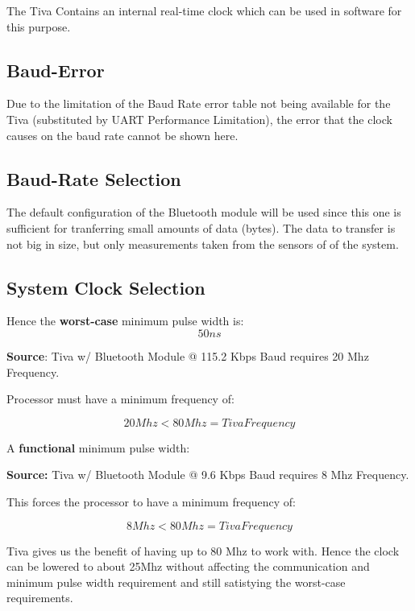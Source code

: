 		The Tiva Contains an internal real-time clock which can be used in software for this purpose.

	\subsection{Baud-Error}
		Due to the limitation of the Baud Rate error table not being available for the Tiva (substituted by UART Performance Limitation), the error that the clock causes on the baud rate cannot be shown here.

	\subsection{Baud-Rate Selection}
		The default configuration of the Bluetooth module will be used since this one is sufficient for tranferring small amounts of data (bytes). The data to transfer is not big in size, but only measurements taken from the sensors of of the system.

	\subsection{System Clock Selection}
		Hence the \textbf{worst-case} minimum pulse width is: 
					$$ 50ns $$

		\noindent \textbf{Source}: Tiva w/ Bluetooth Module @ 115.2 Kbps Baud
		requires 20 Mhz Frequency.

		\noindent Processor must have a minimum frequency of:
			
			$$ 20 Mhz < 80Mhz  = Tiva Frequency $$


		\noindent A \textbf{functional} minimum pulse width:

		\noindent \textbf{Source:} Tiva w/ Bluetooth Module @ 9.6 Kbps Baud requires 8 Mhz Frequency.

		\noindent This forces the processor to have a minimum frequency of:
				
				\textbf{$$ 8 Mhz <  80Mhz = Tiva Frequency $$}

		\noindent Tiva gives us the benefit of having up to 80 Mhz to work with. Hence the clock can be
		lowered to about 25Mhz without affecting the communication  and minimum pulse width requirement and
		still satistying the worst-case requirements.

\newpage